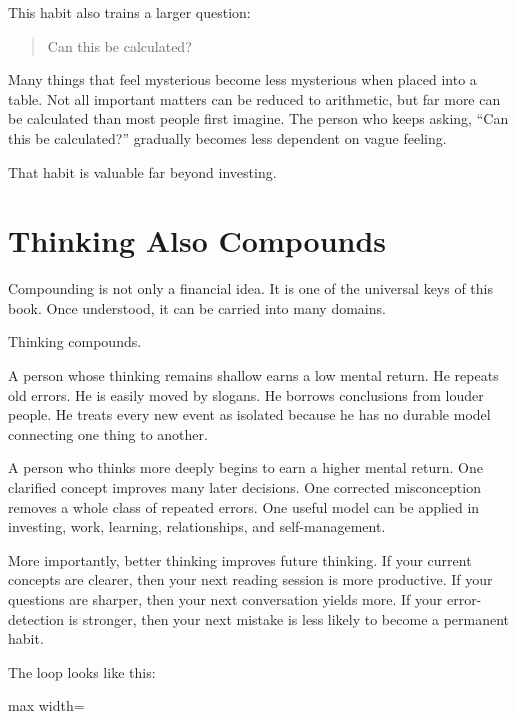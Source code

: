 This habit also trains a larger question:

\begin{quote}
Can this be calculated?
\end{quote}

Many things that feel mysterious become less mysterious when placed into a table. Not all important matters can be reduced to arithmetic, but far more can be calculated than most people first imagine. The person who keeps asking, ``Can this be calculated?'' gradually becomes less dependent on vague feeling.

That habit is valuable far beyond investing.

\section*{Thinking Also Compounds}

Compounding is not only a financial idea. It is one of the universal keys of this book. Once understood, it can be carried into many domains.

Thinking compounds.

A person whose thinking remains shallow earns a low mental return. He repeats old errors. He is easily moved by slogans. He borrows conclusions from louder people. He treats every new event as isolated because he has no durable model connecting one thing to another.

A person who thinks more deeply begins to earn a higher mental return. One clarified concept improves many later decisions. One corrected misconception removes a whole class of repeated errors. One useful model can be applied in investing, work, learning, relationships, and self-management.

More importantly, better thinking improves future thinking. If your current concepts are clearer, then your next reading session is more productive. If your questions are sharper, then your next conversation yields more. If your error-detection is stronger, then your next mistake is less likely to become a permanent habit.

The loop looks like this:

\begin{center}
\begin{adjustbox}{max width=\linewidth}
\end{adjustbox}
\end{center}

